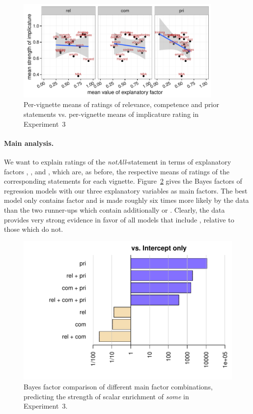 \documentclass[12pt]{article}
\begin{document}
\begin{figure}
  \centering

  \includegraphics[width = 0.9\textwidth]{pics/correlationExp3.pdf}
  
  \caption{Per-vignette means of ratings of relevance, competence and prior statements
    vs. per-vignette means of implicature rating in Experiment~3}
  \label{fig:correlationsExp3}
\end{figure}

\paragraph{Main analysis.} We want to explain ratings of the \emph{notAll}-statement in terms
of explanatory factors \rel, \pri, and \com, which are, as before, the respective means of
ratings of the corresponding statements for each vignette. Figure~\ref{fig:BFsExp3} gives the
Bayes factors of regression models with our three explanatory variables as main factors. The
best model only contains factor \pri and is made roughly six times more likely by the data than
the two runner-ups which contain additionally \rel or \com. Clearly, the data provides very
strong evidence in favor of all models that include \pri, relative to those which do not.

\begin{figure}
  \centering
  \includegraphics[width = 0.8 \textwidth]{pics/bfsAllExp3.pdf}
  \caption{Bayes factor comparison of different main factor combinations, predicting the
    strength of scalar enrichment of \emph{some} in Experiment~3.}
  \label{fig:BFsExp3}
\end{figure}
\end{document}
